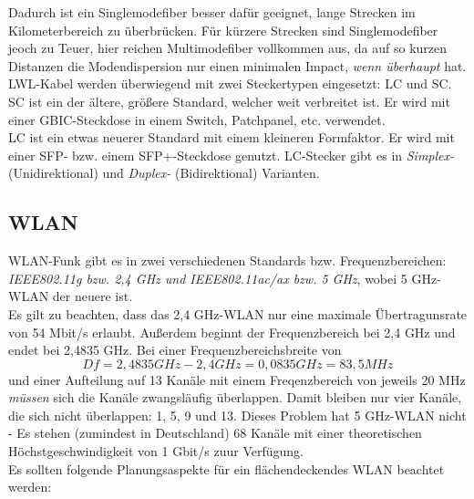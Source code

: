 \documentclass[a4paper, 12pt]{report}
\begin{document}
Dadurch ist ein Singlemodefiber besser dafür geeignet, lange Strecken im 
Kilometerbereich zu überbrücken. Für kürzere Strecken sind Singlemodefiber jeoch
zu Teuer, hier reichen Multimodefiber vollkommen aus, da auf so kurzen Distanzen
die Modendispersion nur einen minimalen Impact, \emph{wenn überhaupt} hat. \\

LWL-Kabel werden überwiegend mit zwei Steckertypen eingesetzt: LC und SC. \\

SC ist ein der ältere, größere Standard, welcher weit verbreitet ist. Er wird 
mit einer GBIC-Steckdose in einem Switch, Patchpanel, etc. verwendet. \\

LC ist ein etwas neuerer Standard mit einem kleineren Formfaktor. Er wird 
mit einer SFP- bzw. einem SFP+-Steckdose genutzt. LC-Stecker gibt es in 
\emph{Simplex-} (Unidirektional) und \emph{Duplex-} (Bidirektional) Varianten. 

\subsection{WLAN}

WLAN-Funk gibt es in zwei verschiedenen Standards bzw. Frequenzbereichen: 
\emph{IEEE802.11g bzw. 2,4 GHz und IEEE802.11ac/ax bzw. 5 GHz}, wobei 5 GHz-WLAN 
der neuere ist. \\

Es gilt zu beachten, dass das 2,4 GHz-WLAN nur eine maximale Übertragunsrate von 
54 Mbit/s erlaubt. Außerdem beginnt der Frequenzbereich bei 2,4 GHz und endet 
bei 2,4835 GHz. Bei einer Frequenzbereichsbreite von $$Df = 2,4835 GHz - 2,4 
GHz = 0,0835 GHz = 83,5 MHz$$ und einer Aufteilung auf 13 Kanäle mit einem 
Freqenzbereich von jeweils 20 MHz \emph{müssen} sich die Kanäle zwangsläufig 
überlappen. Damit bleiben nur vier Kanäle, die sich nicht überlappen: 1, 5, 9 
und 13. Dieses Problem hat 5 GHz-WLAN nicht - Es stehen (zumindest in 
Deutschland) 68 Kanäle mit einer theoretischen Höchstgeschwindigkeit von 
1 Gbit/s zuur Verfügung. \\

Es sollten folgende Planungsaspekte für ein flächendeckendes WLAN beachtet 
werden: 
\end{document}
